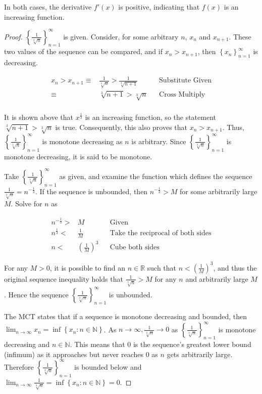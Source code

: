 \documentclass[12pt]{article}
\newcommand{\set}[1]{\left\{ {#1} \right\}}
\newcommand{\limtoinf}[1]{\lim_{ {#1} \to\infty}}
\newcommand{\seq}[1]{\set{ {#1} }_{n=1}^\infty}
\newcommand{\paren}[1]{\left( {#1} \right)}
\newcommand{\bR}{\mathbb{R}}
\newcommand{\bN}{\mathbb{N}}
\begin{document}
\noindent In both cases, the derivative $f'(x)$ is positive, indicating that $f(x)$ is an increasing function.
\begin{proof}
	$\seq{\frac{1}{\sqrt[3]{n}}}$ is given. Consider, for some arbitrary $n$, $x_n$ and $x_{n+1}$. These two values of the sequence can be compared, and if $x_n>x_{n+1}$, then $\seq{x_n}$ is decreasing.
	
\begin{align*}
	x_n>x_{n+1}\equiv&\frac{1}{\sqrt[3]{n}}>\frac{1}{\sqrt[3]{n+1}} && \text{Substitute Given} \\
	\equiv& \sqrt[3]{n+1} > \sqrt[3]{n} && \text{Cross Multiply} \\
\end{align*}

\noindent It is shown above that $x^\frac{1}{3}$ is an increasing function, so the statement $\sqrt[3]{n+1} > \sqrt[3]{n}$ is true. Consequently, this also proves that $x_n>x_{n+1}$. Thus, $\seq{\frac{1}{\sqrt[3]{n}}}$ is monotone decreasing as $n$ is arbitrary. Since $\seq{\frac{1}{\sqrt[3]{n}}}$ is monotone decreasing, it is said to be monotone.

\indent Take $\seq{\frac{1}{\sqrt[3]{n}}}$ as given, and examine the function which defines the sequence $\frac{1}{\sqrt[3]{n}}=n^{-\frac{1}{3}}$. If the sequence is unbounded, then $n^{-\frac{1}{3}}>M$ for some arbitrarily large $M$. Solve for $n$ as

\begin{align*}
	n^{-\frac{1}{3}}>&M && \text{Given} \\
	n^{\frac{1}{3}}<&\frac{1}{M} && \text{Take the reciprocal of both sides} \\
	n <& \paren{\frac{1}{M}}^3 && \text{Cube both sides}
\end{align*}

\noindent For any $M>0$, it is possible to find an $n\in\bR$ such that $n<\paren{\frac{1}{M}}^3$, and thus the original sequence inequality holds that $\frac{1}{\sqrt[3]{n}}>M$ for any $n$ and arbitrarily large $M$. Hence the sequence $\seq{\frac{1}{\sqrt[3]{n}}}$ is unbounded.

\indent The MCT states that if a sequence is monotone decreasing and bounded, then $\limtoinf{n}x_n = \inf\set{x_n:n\in\bN}$. As $n\to\infty, \frac{1}{\sqrt[3]{n}}\to0$ as $\seq{\frac{1}{\sqrt[3]{n}}}$ is monotone decreasing and $n\in\bN$. This means that 0 is the sequence's greatest lower bound (infimum) as it approaches but never reaches 0 as $n$ gets arbitrarily large. Therefore $\seq{\frac{1}{\sqrt[3]{n}}}$ is bounded below and $\limtoinf{n}\frac{1}{\sqrt[3]{n}} = \inf\set{x_n:n\in\bN}=0$.
\end{proof}
\end{document}

